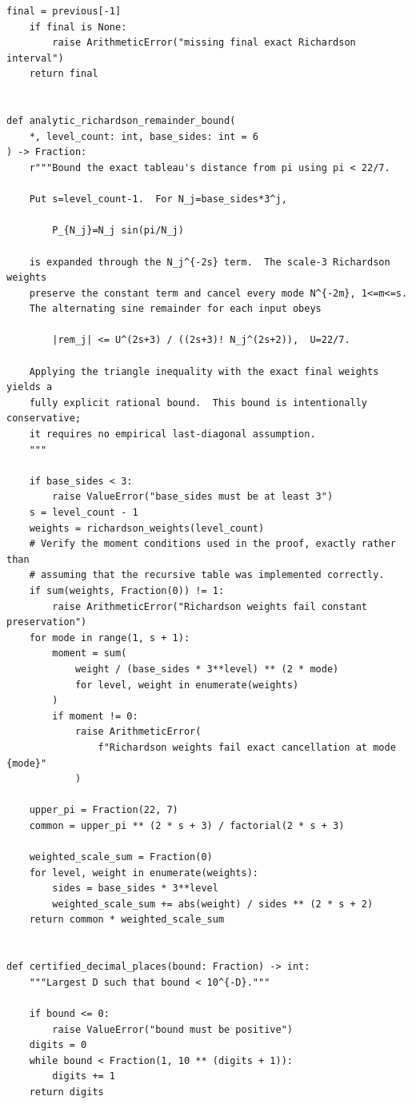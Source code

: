 \documentclass[11pt]{article}
\begin{document}
\begin{lstlisting}[style=pythonstyle,caption={Exact certification lane: \texttt{certified\_richardson.py}}]
    final = previous[-1]
    if final is None:
        raise ArithmeticError("missing final exact Richardson interval")
    return final


def analytic_richardson_remainder_bound(
    *, level_count: int, base_sides: int = 6
) -> Fraction:
    r"""Bound the exact tableau's distance from pi using pi < 22/7.

    Put s=level_count-1.  For N_j=base_sides*3^j,

        P_{N_j}=N_j sin(pi/N_j)

    is expanded through the N_j^{-2s} term.  The scale-3 Richardson weights
    preserve the constant term and cancel every mode N^{-2m}, 1<=m<=s.
    The alternating sine remainder for each input obeys

        |rem_j| <= U^(2s+3) / ((2s+3)! N_j^(2s+2)),  U=22/7.

    Applying the triangle inequality with the exact final weights yields a
    fully explicit rational bound.  This bound is intentionally conservative;
    it requires no empirical last-diagonal assumption.
    """

    if base_sides < 3:
        raise ValueError("base_sides must be at least 3")
    s = level_count - 1
    weights = richardson_weights(level_count)
    # Verify the moment conditions used in the proof, exactly rather than
    # assuming that the recursive table was implemented correctly.
    if sum(weights, Fraction(0)) != 1:
        raise ArithmeticError("Richardson weights fail constant preservation")
    for mode in range(1, s + 1):
        moment = sum(
            weight / (base_sides * 3**level) ** (2 * mode)
            for level, weight in enumerate(weights)
        )
        if moment != 0:
            raise ArithmeticError(
                f"Richardson weights fail exact cancellation at mode {mode}"
            )

    upper_pi = Fraction(22, 7)
    common = upper_pi ** (2 * s + 3) / factorial(2 * s + 3)

    weighted_scale_sum = Fraction(0)
    for level, weight in enumerate(weights):
        sides = base_sides * 3**level
        weighted_scale_sum += abs(weight) / sides ** (2 * s + 2)
    return common * weighted_scale_sum


def certified_decimal_places(bound: Fraction) -> int:
    """Largest D such that bound < 10^{-D}."""

    if bound <= 0:
        raise ValueError("bound must be positive")
    digits = 0
    while bound < Fraction(1, 10 ** (digits + 1)):
        digits += 1
    return digits



\end{lstlisting}
\end{document}
